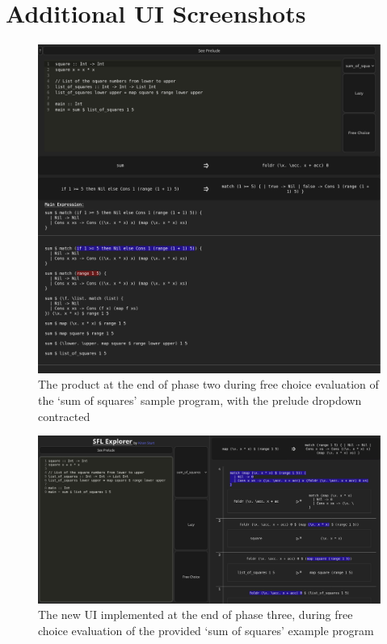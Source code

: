 \chapter{Additional UI Screenshots}
\begin{figure}[h]
    \centering
    \includegraphics[width=1\linewidth]{images/phase-2-end3.png} 
    \captionsetup{justification=centering}
    \caption{The product at the end of phase two during free choice evaluation of the `sum of squares' sample program, with the prelude dropdown contracted}
    \label{fig:screenshot_c2_end_free}
\end{figure}

\begin{figure}[h]
    \centering
    \includegraphics[width=\linewidth]{images/phase-3-end-free.png}
    \caption{The new UI implemented at the end of phase three, during free choice evaluation of the provided `sum of squares' example program}
    \label{screenshot:phase3_end_free}
\end{figure}

